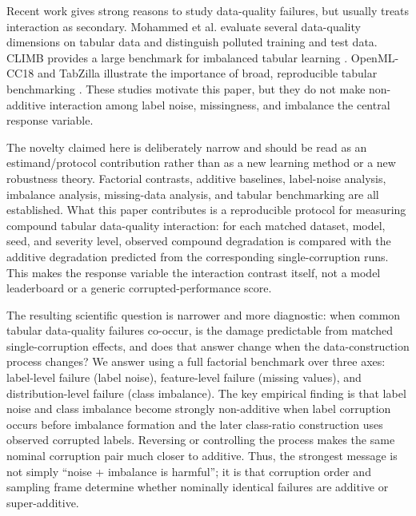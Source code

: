 \documentclass[preprint,12pt,number]{elsarticle}
\begin{document}
Recent work gives strong reasons to study data-quality failures, but usually treats interaction as secondary. Mohammed et al. \citep{mohammed2025effects} evaluate several data-quality dimensions on tabular data and distinguish polluted training and test data. CLIMB provides a large benchmark for imbalanced tabular learning \citep{liu2025climb}. OpenML-CC18 and TabZilla illustrate the importance of broad, reproducible tabular benchmarking \citep{bischl2021openml,mcelfresh2023tabzilla,grinsztajn2022tree}. These studies motivate this paper, but they do not make non-additive interaction among label noise, missingness, and imbalance the central response variable.

The novelty claimed here is deliberately narrow and should be read as an estimand/protocol contribution rather than as a new learning method or a new robustness theory. Factorial contrasts, additive baselines, label-noise analysis, imbalance analysis, missing-data analysis, and tabular benchmarking are all established. What this paper contributes is a reproducible protocol for measuring compound tabular data-quality interaction: for each matched dataset, model, seed, and severity level, observed compound degradation is compared with the additive degradation predicted from the corresponding single-corruption runs. This makes the response variable the interaction contrast itself, not a model leaderboard or a generic corrupted-performance score.

The resulting scientific question is narrower and more diagnostic: when common tabular data-quality failures co-occur, is the damage predictable from matched single-corruption effects, and does that answer change when the data-construction process changes? We answer using a full factorial benchmark over three axes: label-level failure (label noise), feature-level failure (missing values), and distribution-level failure (class imbalance). The key empirical finding is that label noise and class imbalance become strongly non-additive when label corruption occurs before imbalance formation and the later class-ratio construction uses observed corrupted labels. Reversing or controlling the process makes the same nominal corruption pair much closer to additive. Thus, the strongest message is not simply ``noise + imbalance is harmful''; it is that corruption order and sampling frame determine whether nominally identical failures are additive or super-additive.
\end{document}
